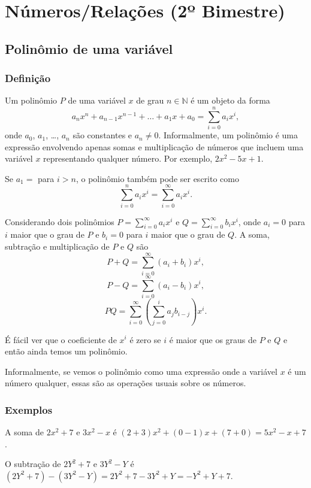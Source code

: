 \chapter{Números/Relações (2º Bimestre)}

\section{Polinômio de uma variável}

\subsection*{Definição}

Um polinômio $P$ de uma variável $x$ de grau $n \in \mathbb{N}$ é um objeto da
forma
$$a_n x^n + a_{n-1} x^{n-1} + \ldots + a_1 x + a_0 = \sum_{i=0}^n a_i x^i,$$
onde $a_0$, $a_1$, \ldots, $a_n$ são constantes e $a_n \neq 0$.
Informalmente, um polinômio é uma expressão envolvendo apenas somas e
multiplicação de números que incluem uma variável $x$ representando qualquer
número. Por exemplo, $2 x^2 - 5 x + 1$.

Se $a_1 = $ para $i > n$, o polinômio também pode ser escrito como
$$\sum_{i=0}^n a_i x^i = \sum_{i=0}^{\infty} a_i x^i.$$

Considerando dois polinômios $P = \sum_{i = 0}^{\infty} a_i x^i$ e
$Q = \sum_{i = 0}^{\infty} b_i x^i$, onde $a_i = 0$ para $i$ maior que o grau de
$P$ e $b_i = 0$ para $i$ maior que o grau de $Q$.
A soma, subtração e multiplicação de $P$ e $Q$ são
$$P + Q = \sum_{i = 0}^{\infty} {(a_i + b_i)} x^i,$$
$$P - Q = \sum_{i = 0}^{\infty} {(a_i - b_i)} x^i,$$
$$PQ = \sum_{i = 0}^{\infty} \left(\sum_{j = 0}^{i} a_{j} b_{i - j}\right) x^i.$$

É fácil ver que o coeficiente de $x^i$ é zero se $i$ é maior que os graus de $P$
e $Q$ e então ainda temos um polinômio.

Informalmente, se vemos o polinômio como uma expressão onde a variável $x$ é um
número qualquer, essas são as operações usuais sobre os números.

\subsection*{Exemplos}

A soma de $2x^2 + 7$ e $3x^2 - x$ é $(2+3)x^2 + (0-1)x + (7+0) = 5x^2 - x + 7$.

O subtração de $2Y^2 + 7$ e $3Y^2 - Y$ é $(2Y^2 + 7) - (3Y^2 - Y) = 2Y^2 + 7 - 3Y^2 + Y = -Y^2 + Y + 7$.

